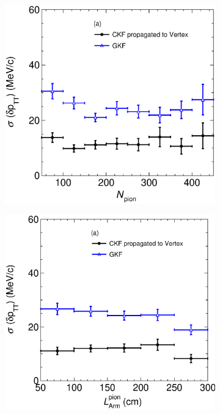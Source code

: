 \begin{figure}[t]
          \begin{subfigure}[b]{0.32\textwidth}
         \centering
         \includegraphics[width=\textwidth]{figures/ch6-TKI/2D/deltapTTVSN211.eps}
         \caption{}
         \label{fig:deltapTTVSN211}
     \end{subfigure}
     \begin{subfigure}[b]{0.32\textwidth}
         \centering
         \includegraphics[width=\textwidth]{figures/ch6-TKI/2D/deltapTTVSlArmMC211.eps}

\end{subfigure}
\end{figure}
